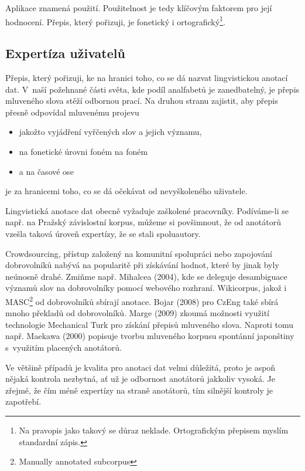 
Aplikace znamená použití. Použitelnost je tedy klíčovým faktorem pro její hodnocení.
Přepis, který pořizuji, je fonetický i ortografický\footnote{Na pravopis jako
takový se důraz neklade. Ortografickým přepisem myslím standardní zápis.}.

\subsection{Expertíza uživatelů}

Přepis, který pořizuji, ke na hranici toho, co se dá nazvat lingvistickou
anotací dat. V~naší požehnané části světa, kde podíl analfabetů je zanedbatelný,
je přepis mluveného slova stěží odbornou prací. Na druhou stranu zajistit, aby
přepis přesně odpovídal mluvenému projevu
\begin{itemize}
\item{jakožto vyjádření vyřčených slov a jejich významu,}
\item{na fonetické úrovni foném na foném}
\item{a na časové ose}
\end{itemize}
je za hranicemi toho, co se dá očekávat od nevyškoleného uživatele.

Lingvistická anotace dat obecně vyžaduje zaškolené pracovníky. Podíváme-li se
např. na Pražský závislostní korpus, můžeme si povšimnout, že od anotátorů
vzešla taková úroveň expertízy, že se stali spoluautory\cite{hajivc2005complex}.

Crowdsourcing, přístup založený na komunitní spolupráci nebo zapojování
dobrovolníků nabývá na popularitě při získávání hodnot, které by jinak byly
neúnosně drahé. Zmiňme např. Mihalcea (2004)\cite{mihalcea2004building}, kde se
deleguje desambiguace významů slov na dobrovolníky pomocí webového rozhraní.
Wikicorpus\cite{reese2010wikicorpus}, jakož i MASC\footnote{Manually annotated
subcorpus}\cite{ide2010manually} od dobrovolníků sbírají anotace. Bojar
(2008)\cite{bojar2008czeng} pro CzEng také sbírá mnoho překladů od dobrovolníků.
Marge (2009)\cite{5494979} zkoumá možnosti využití technologie Mechanical Turk
pro získání přepisů mluveného slova.
Naproti tomu např. Maekawa (2000)\cite{maekawa2000spontaneous} popisuje tvorbu
mluveného korpusu spontánní japonštiny s~využitím placených anotátorů.

Ve většině případů je kvalita pro anotaci dat velmi důležitá, proto je aspoň
nějaká kontrola nezbytná, ať už je odbornost anotátorů jakkoliv vysoká. Je
zřejmé, že čím méně expertízy na straně anotátorů, tím silnější kontroly je
zapotřebí.

